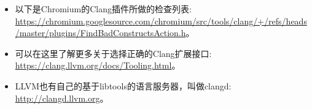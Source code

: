 
\begin{itemize}
\item 以下是Chromium的Clang插件所做的检查列表: \url{https://chromium.googlesource.com/chromium/src/tools/clang/+/refs/heads/master/plugins/FindBadConstructsAction.h}。

\item 可以在这里了解更多关于选择正确的Clang扩展接口: \url{https://clang.llvm.org/docs/Tooling.html}。

\item LLVM也有自己的基于libtools的语言服务器，叫做clangd: \url{http://clangd.llvm.org}。
\end{itemize}
